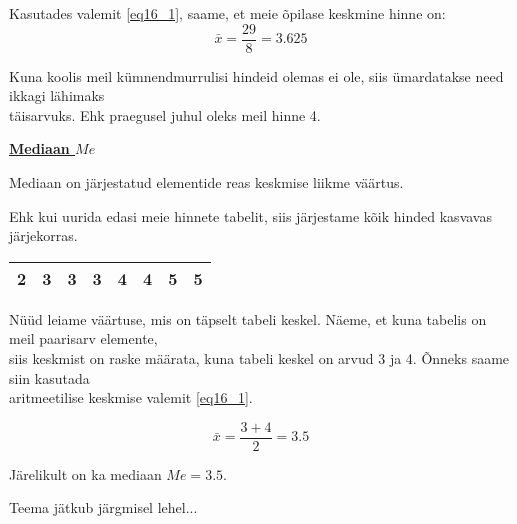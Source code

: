\begin{center}
{{{\begin{flushleft}
\vspace{2mm}
\hspace{5mm}
Kasutades valemit \ref{eq16_1}, saame, et meie õpilase keskmine hinne on:\\

\begin{equation}
\label{eq16_3}
\bar{x}=\dfrac{29}{8} = 3.625
\end{equation}

\vspace{2mm} 
\hspace{5mm}
Kuna koolis meil kümnendmurrulisi hindeid olemas ei ole, siis ümardatakse need ikkagi lähimaks\\ \hspace{5mm} täisarvuks. Ehk praegusel juhul oleks meil hinne 4.

\vspace{5mm}
\hspace{5mm}
\textbf{\underline{Mediaan $Me$}}

\vspace{2mm}
\hspace{5mm}
Mediaan on järjestatud elementide reas keskmise liikme väärtus.

\vspace{2mm}
\hspace{5mm}
Ehk kui uurida edasi meie hinnete tabelit, siis järjestame kõik hinded kasvavas järjekorras.

\vspace{2mm}
\hspace{5mm}
\begin{tabular}{|c|c|c|c|c|c|c|c|}
	\hline
	2 & 3 & 3 & 3 & 4 & 4 & 5 & 5\\
	\hline
\end{tabular}

\vspace{2mm}
\hspace{5mm}
Nüüd leiame väärtuse, mis on täpselt tabeli keskel. Näeme, et kuna tabelis on meil paarisarv elemente,\\ \hspace{5mm} siis keskmist on raske määrata, kuna tabeli keskel on arvud 3 ja 4. Õnneks saame siin kasutada \\ \hspace{5mm} aritmeetilise keskmise valemit \ref{eq16_1}.

\vspace{2mm}
\hspace{5mm}
\begin{equation}
\label{eq16_4}
\bar{x} = \dfrac{3+4}{2} = 3.5
\end{equation}

\vspace{2mm}
\hspace{5mm}
Järelikult on ka mediaan $Me=3.5$.

\vspace{2mm}
\hspace{5mm}
Teema jätkub järgmisel lehel...


\end{flushleft}
}}}
\end{center}





